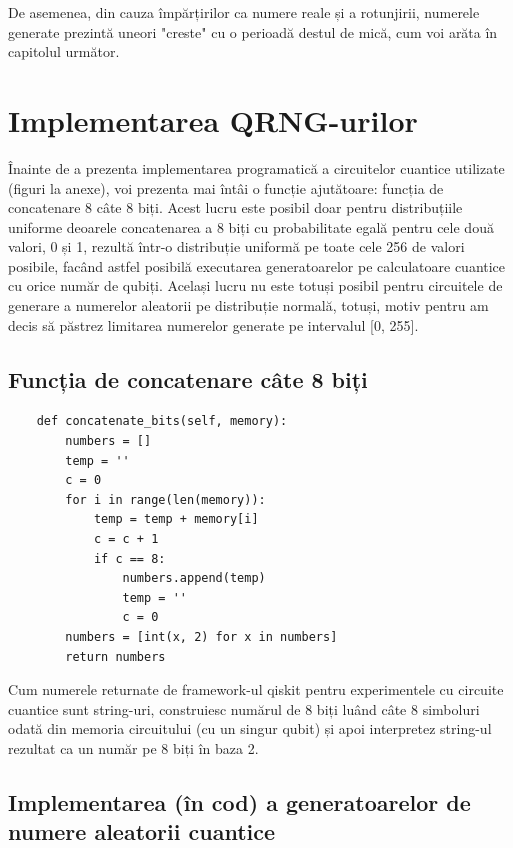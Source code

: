 De asemenea, din cauza împărțirilor ca numere reale și a rotunjirii, numerele generate prezintă uneori "creste" cu o perioadă destul de mică, cum voi arăta în capitolul următor.

\section{Implementarea QRNG-urilor}

Înainte de a prezenta implementarea programatică a circuitelor cuantice utilizate (figuri la anexe), voi prezenta mai întâi o funcție ajutătoare: funcția de concatenare 8 câte 8 biți. Acest lucru este posibil doar pentru distribuțiile uniforme deoarele concatenarea a 8 biți cu probabilitate egală pentru cele două valori, 0 și 1, rezultă într-o distribuție uniformă pe toate cele 256 de valori posibile, facând astfel posibilă executarea generatoarelor pe calculatoare cuantice cu orice număr de qubiți. Același lucru nu este totuși posibil pentru circuitele de generare a numerelor aleatorii pe distribuție normală, totuși, motiv pentru am decis să păstrez limitarea numerelor generate pe intervalul [0, 255]. 

\subsection{Funcția de concatenare câte 8 biți}

\begin{code}
\begin{verbatim}
    def concatenate_bits(self, memory):
        numbers = []
        temp = ''
        c = 0
        for i in range(len(memory)):
            temp = temp + memory[i]
            c = c + 1
            if c == 8:
                numbers.append(temp)
                temp = ''
                c = 0
        numbers = [int(x, 2) for x in numbers]
        return numbers
\end{verbatim}
\end{code}

Cum numerele returnate de framework-ul qiskit pentru experimentele cu circuite cuantice sunt string-uri, construiesc numărul de 8 biți luând câte 8 simboluri odată din memoria circuitului (cu un singur qubit) și apoi interpretez string-ul rezultat ca un număr pe 8 biți în baza 2.

\subsection{Implementarea (în cod) a generatoarelor de numere aleatorii cuantice}

